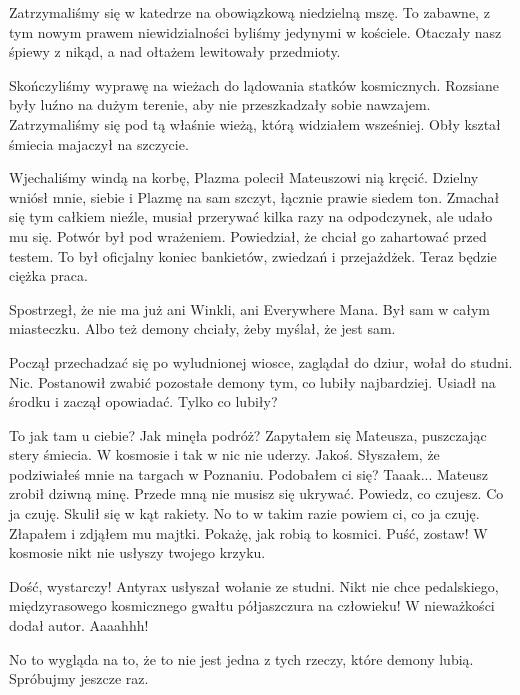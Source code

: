 Zatrzymaliśmy się w katedrze na obowiązkową niedzielną mszę.
To zabawne, z tym nowym prawem niewidzialności byliśmy jedynymi w kościele. 
Otaczały nasz śpiewy z nikąd, a nad ołtażem lewitowały przedmioty.

Skończyliśmy wyprawę na wieżach do lądowania statków kosmicznych.
Rozsiane były luźno na dużym terenie, aby nie przeszkadzały sobie nawzajem.
Zatrzymaliśmy się pod tą właśnie wieżą, którą widziałem wsześniej. 
Obły kształ śmiecia majaczył na szczycie.

Wjechaliśmy windą na korbę, Plazma polecił Mateuszowi nią kręcić.
Dzielny wniósł mnie, siebie i Plazmę na sam szczyt, łącznie prawie siedem ton. 
Zmachał się tym całkiem nieźle, musiał przerywać kilka razy na odpodczynek, ale udało mu się.
Potwór był pod wrażeniem. Powiedział, że chciał go zahartować przed testem. 
To był oficjalny koniec bankietów, zwiedzań i przejażdżek. Teraz będzie ciężka praca.

\divider{}

Spostrzegł, że nie ma już ani Winkli, ani Everywhere Mana. 
Był sam w całym miasteczku.
Albo też demony chciały, żeby myślał, że jest sam.

Począł przechadzać się po wyludnionej wiosce, zaglądał do dziur, wołał do studni. Nic.
Postanowił zwabić pozostałe demony tym, co lubiły najbardziej.
Usiadł na środku i zaczął opowiadać. Tylko co lubiły?

\divider{}

\begin{dialogue}
\ds{} To jak tam u ciebie? Jak minęła podróż? \dm{} Zapytałem się Mateusza, puszczając stery śmiecia. W kosmosie i tak w nic nie uderzy.
\ds{} Jakoś.
\ds{} Słyszałem, że podziwiałeś mnie na targach w Poznaniu. Podobałem ci się?
\ds{} Taaak... \dm{} Mateusz zrobił dziwną minę.
\ds{} Przede mną nie musisz się ukrywać. Powiedz, co czujesz.
\ds{} Co ja czuję. \dm{} Skulił się w kąt rakiety.
\ds{} No to w takim razie powiem ci, co ja czuję. \dm{} Złapałem i zdjąłem mu majtki. \dm{} Pokażę, jak robią to kosmici.
\ds{} Puść, zostaw!
\ds{} W kosmosie nikt nie usłyszy twojego krzyku.
\end{dialogue}

\divider{}

\begin{dialogue}
\ds{} Dość, wystarczy! \dm{} Antyrax usłyszał wołanie ze studni. \dm{} Nikt nie chce pedalskiego, międzyrasowego kosmicznego gwałtu półjaszczura na człowieku!
\ds{} W nieważkości \dm{} dodał autor.
\ds{} Aaaahhh!
\end{dialogue}
No to wygląda na to, że to nie jest jedna z tych rzeczy, które demony lubią.
Spróbujmy jeszcze raz.

